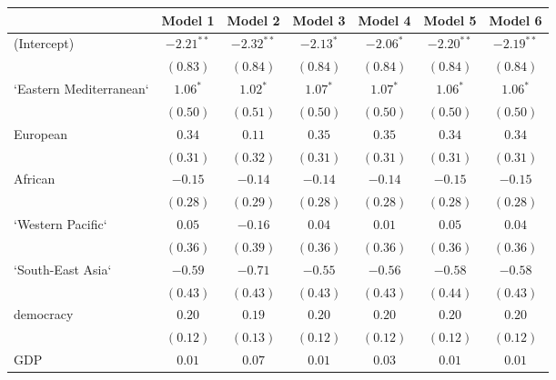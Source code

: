 
\begin{table}[!h]
\begin{center}
\begin{tabular}{l c c c c c c }
\toprule
 & Model 1 & Model 2 & Model 3 & Model 4 & Model 5 & Model 6 \\
\midrule
(Intercept)             & $-2.21^{**}$ & $-2.32^{**}$ & $-2.13^{*}$  & $-2.06^{*}$  & $-2.20^{**}$ & $-2.19^{**}$ \\
                        & $(0.83)$     & $(0.84)$     & $(0.84)$     & $(0.84)$     & $(0.84)$     & $(0.84)$     \\
`Eastern Mediterranean` & $1.06^{*}$   & $1.02^{*}$   & $1.07^{*}$   & $1.07^{*}$   & $1.06^{*}$   & $1.06^{*}$   \\
                        & $(0.50)$     & $(0.51)$     & $(0.50)$     & $(0.50)$     & $(0.50)$     & $(0.50)$     \\
European                & $0.34$       & $0.11$       & $0.35$       & $0.35$       & $0.34$       & $0.34$       \\
                        & $(0.31)$     & $(0.32)$     & $(0.31)$     & $(0.31)$     & $(0.31)$     & $(0.31)$     \\
African                 & $-0.15$      & $-0.14$      & $-0.14$      & $-0.14$      & $-0.15$      & $-0.15$      \\
                        & $(0.28)$     & $(0.29)$     & $(0.28)$     & $(0.28)$     & $(0.28)$     & $(0.28)$     \\
`Western Pacific`       & $0.05$       & $-0.16$      & $0.04$       & $0.01$       & $0.05$       & $0.04$       \\
                        & $(0.36)$     & $(0.39)$     & $(0.36)$     & $(0.36)$     & $(0.36)$     & $(0.36)$     \\
`South-East Asia`       & $-0.59$      & $-0.71$      & $-0.55$      & $-0.56$      & $-0.58$      & $-0.58$      \\
                        & $(0.43)$     & $(0.43)$     & $(0.43)$     & $(0.43)$     & $(0.44)$     & $(0.43)$     \\
democracy               & $0.20$       & $0.19$       & $0.20$       & $0.20$       & $0.20$       & $0.20$       \\
                        & $(0.12)$     & $(0.13)$     & $(0.12)$     & $(0.12)$     & $(0.12)$     & $(0.12)$     \\
GDP                     & $0.01$       & $0.07$       & $0.01$       & $0.03$       & $0.01$       & $0.01$       \\

\end{tabular}
\end{center}
\end{table}
